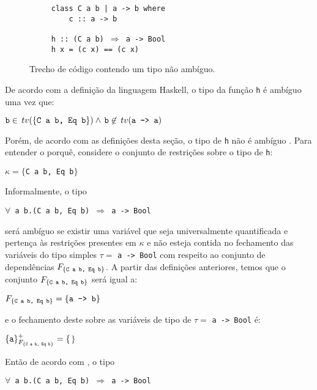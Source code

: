 \begin{figure}[h]
	\begin{flushleft}
\verb|     |\texttt{class C a b | a -> b where}\\
\verb|         |\texttt{c :: a -> b}\\
\verb|     |\\
\verb|     |\texttt{h :: (C a b) $\Rightarrow$ a -> Bool}\\
\verb|     |\texttt{h x = (c x) == (c x)}		
	\end{flushleft}
	\caption{Trecho de c\'odigo contendo um tipo n\~ao amb\'iguo.}
\end{figure}
De acordo com a defini\c{c}\~ao da linguagem Haskell, o tipo da fun\c{c}\~ao \texttt{h} \'e amb\'iguo uma vez que:
\begin{center} 
$\text{\texttt{b}}\in\,tv(\{\text{\texttt{C a b, Eq b}}\})\land\,\text{\texttt{b}}\not\in\,tv(\text{\texttt{a -> a}})$
\end{center}
Por\'em, de acordo com as defini\c{c}\~oes desta se\c{c}\~ao, o tipo de \texttt{h} n\~ao \'e amb\'iguo \cite{Jones00}. 
Para entender o porqu\^e, considere o conjunto de restri\c{c}\~oes sobre o tipo de \texttt{h}:
\begin{center}
	$\kappa=\{$\texttt{C a b, Eq b}$\}$
\end{center}
Informalmente, o tipo
\begin{center} 
	\texttt{$\forall$ a b.(C a b, Eq b) $\Rightarrow$ a -> Bool}
\end{center} 
ser\'a amb\'iguo se existir uma vari\'avel que seja
universalmente quantificada e perten\c{c}a \`as restri\c{c}\~oes presentes em $\kappa$ e n\~ao esteja contida no
fechamento das vari\'aveis do tipo simples $\tau = $ \texttt{a -> Bool} com respeito ao conjunto de depend\^encias
$F_{\{\text{\texttt{C a b, Eq b}}\}}$. A partir das defini\c{c}\~oes anteriores, temos que o conjunto 
$F_{\{\text{\texttt{C a b, Eq b}}\}}$ ser\'a igual a:
\begin{center}
	$F_{\{\text{\texttt{C a b, Eq b}}\}}=\{\text{\texttt{a -> b}}\}$
\end{center}
e o fechamento deste sobre as vari\'aveis de tipo de $\tau = $ \texttt{a -> Bool} \'e:
\begin{center} 
	$\{\text{\texttt{a}}\}^{+}_{F_{\{\text{\texttt{C a b, Eq b}}\}}}=\{$$\}$
\end{center}
Ent\~ao de acordo com \cite{Jones00}, o tipo 
\begin{center} 
	\texttt{$\forall$ a b.(C a b, Eq b) $\Rightarrow$ a -> Bool}
\end{center} 
